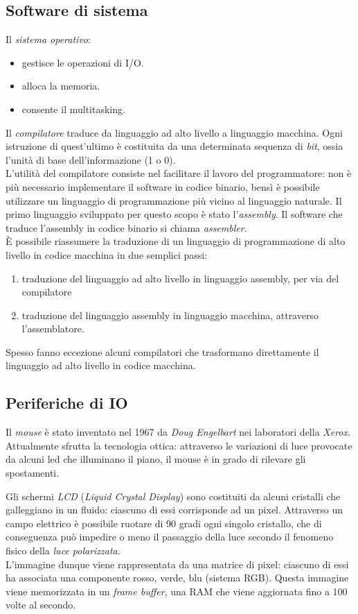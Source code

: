 \documentclass[class=book, crop=false]{standalone}
\begin{document}
\subsection{Software di sistema}
Il \emph{sistema operativo}:
\begin{itemize}[noitemsep]
	\item gestisce le operazioni di I/O.
	\item alloca la memoria.
	\item consente il multitasking.
\end{itemize}
Il \emph{compilatore} traduce da linguaggio ad alto livello a linguaggio macchina. Ogni istruzione di quest'ultimo è costituita da una determinata sequenza di \emph{bit}, ossia l'unità di base dell'informazione (1 o 0).\\
L'utilità del compilatore consiste nel facilitare il lavoro del programmatore: non è più necessario implementare il software in codice binario, bensì è possibile utilizzare un linguaggio di programmazione più vicino al linguaggio naturale. Il primo linguaggio sviluppato per questo scopo è stato l'\emph{assembly}. Il software che traduce l'assembly in codice binario si chiama \emph{assembler}.\\
\`{E} possibile riassumere la traduzione di un linguaggio di programmazione di alto livello in codice macchina in due semplici passi:
\begin{enumerate}[noitemsep]
	\item traduzione del linguaggio ad alto livello in linguaggio assembly, per via del compilatore
	\item traduzione del linguaggio assembly in linguaggio macchina, attraverso l'assemblatore.
\end{enumerate}
Spesso fanno eccezione alcuni compilatori che trasformano direttamente il linguaggio ad alto livello in codice macchina.

\subsection{Periferiche di IO}
Il \emph{mouse} è stato inventato nel 1967 da \emph{Doug Engelbart} nei laboratori della \emph{Xerox}. Attualmente sfrutta la tecnologia ottica: attraverso le variazioni di luce provocate da alcuni led che illuminano il piano, il mouse è in grado di rilevare gli spostamenti.

Gli schermi \emph{LCD} (\emph{Liquid Crystal Display}) sono costituiti da alcuni cristalli che galleggiano in un fluido: ciascuno di essi corrisponde ad un pixel. Attraverso un campo elettrico è possibile ruotare di 90 gradi ogni singolo cristallo, che di conseguenza può impedire o meno il passaggio della luce secondo il fenomeno fisico della \emph{luce polarizzata}.\\
L'immagine dunque viene rappresentata da una matrice di pixel: ciascuno di essi ha associata una componente rosso, verde, blu (sistema RGB). Questa immagine viene memorizzata in un \emph{frame buffer}, una RAM che viene aggiornata  fino a 100 volte al secondo.
\end{document}
